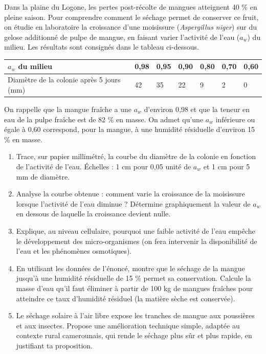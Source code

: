 \documentclass[11pt]{article}
\newcounter{popsec}
\newcounter{popsub}
\newcommand{\courssub}[1]{%
  \stepcounter{popsub}%
  \par\vspace{9pt}\noindent{\popxbold\fontsize{11.5}{13}\selectfont\color{popink}{\color{poporange}\thepopsec.\thepopsub}\hspace{6pt}#1}\par\nopagebreak\vspace{4pt}
}
\begin{document}
\courssub{Je me prépare au Bac}

\begin{exercice}
Dans la plaine du Logone, les pertes post-récolte de mangues atteignent 40 \% en pleine saison. Pour comprendre comment le séchage permet de conserver ce fruit, on étudie en laboratoire la croissance d'une moisissure (\emph{Aspergillus niger}) sur du gelose additionné de pulpe de mangue, en faisant varier l'activité de l'eau ($a_w$) du milieu. Les résultats sont consignés dans le tableau ci-dessous.

\begin{center}
\begin{tabularx}{\linewidth}{|l|X|X|X|X|X|X|}\hline
\rowcolor{popblueL} $a_w$ du milieu & 0{,}98 & 0{,}95 & 0{,}90 & 0{,}80 & 0{,}70 & 0{,}60 \\ \hline
Diamètre de la colonie après 5 jours (mm) & 42 & 35 & 22 & 9 & 2 & 0 \\ \hline
\end{tabularx}
\end{center}

On rappelle que la mangue fraîche a une $a_w$ d'environ 0{,}98 et que la teneur en eau de la pulpe fraîche est de 82 \% en masse. On admet qu'une $a_w$ inférieure ou égale à 0{,}60 correspond, pour la mangue, à une humidité résiduelle d'environ 15 \% en masse.

\begin{enumerate}
\item Trace, sur papier millimétré, la courbe du diamètre de la colonie en fonction de l'activité de l'eau. Échelles : 1 cm pour 0{,}05 unité de $a_w$ et 1 cm pour 5 mm de diamètre.
\item Analyse la courbe obtenue : comment varie la croissance de la moisissure lorsque l'activité de l'eau diminue ? Détermine graphiquement la valeur de $a_w$ en dessous de laquelle la croissance devient nulle.
\item Explique, au niveau cellulaire, pourquoi une faible activité de l'eau empêche le développement des micro-organismes (on fera intervenir la disponibilité de l'eau et les phénomènes osmotiques).
\item En utilisant les données de l'énoncé, montre que le séchage de la mangue jusqu'à une humidité résiduelle de 15 \% permet sa conservation. Calcule la masse d'eau qu'il faut éliminer à partir de 100 kg de mangues fraîches pour atteindre ce taux d'humidité résiduel (la matière sèche est conservée).
\item Le séchage solaire à l'air libre expose les tranches de mangue aux poussières et aux insectes. Propose une amélioration technique simple, adaptée au contexte rural camerounais, qui rende le séchage plus sûr et plus rapide, en justifiant ta proposition.
\end{enumerate}
\end{exercice}
\end{document}
